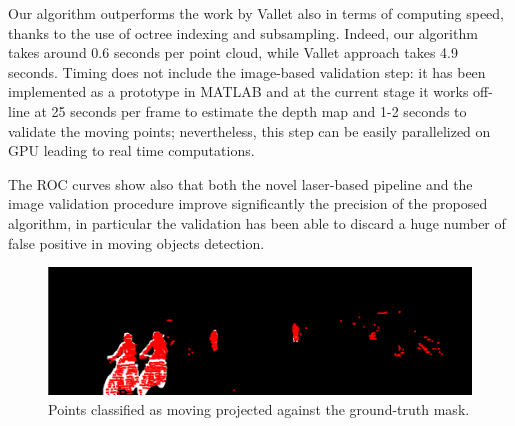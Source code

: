 Our algorithm outperforms the work by Vallet \etal also in terms of computing speed, thanks to the use of octree indexing and subsampling. 
Indeed, our algorithm takes around 0.6 seconds per point cloud, while Vallet \etal approach takes 4.9 seconds.
Timing does not include the image-based validation step: it has been implemented as a prototype in MATLAB and at the current stage it works off-line at 25 seconds per frame to estimate the depth map and 1-2 seconds to validate the moving points; nevertheless, this step can be easily parallelized on GPU leading to real time computations.

The ROC curves show also that both the novel laser-based pipeline and the image validation procedure improve significantly the precision of the proposed algorithm, in particular the validation has been able to discard a huge number of false positive in moving objects detection.


\begin{figure}[t]
\centering
\includegraphics[width=0.98\columnwidth]{./img/ch-laser/points_result_on_mask}
\caption{Points classified as moving projected against the ground-truth mask.} 
\label{fig:points}
\end{figure}




